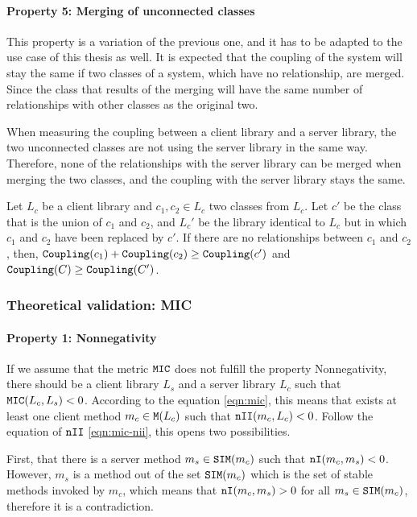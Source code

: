 \paragraph{Property 5: Merging of unconnected classes}
This property is a variation of the previous one, and it has to be adapted to the use case of this thesis as well. It is expected that the coupling of the system will stay the same if two classes of a system, which have no relationship, are merged. Since the class that results of the merging will have the same number of relationships with other classes as the original two.

When measuring the coupling between a client library and a server library, the two unconnected classes are not using the server library in the same way. Therefore, none of the relationships with the server library can be merged when merging the two classes, and the coupling with the server library stays the same.

Let $L_c$ be a client library and $c_1, c_2 \in L_c$ two classes from $L_c$. Let $c'$ be the class that is the union of  $c_1$ and $c_2$, and $L_c'$ be the library identical to $L_c$ but in which $c_1$ and $c_2$ have been replaced by $c'$. If there are no relationships between $c_1$ and $c_2$, then, $\verb|Coupling|(c_1) + \verb|Coupling|(c_2) \ge \verb|Coupling|(c')$ and $\verb|Coupling|(C) \ge \verb|Coupling|(C')$.

\subsubsection{Theoretical validation: MIC}

\paragraph{Property 1: Nonnegativity}
If we assume that the metric $\verb|MIC|$ does not fulfill the property Nonnegativity, there should be a client library $L_s$ and a server library $L_c$ such that $\verb|MIC|(L_c, L_s) < 0$.
According to the equation \ref{eqn:mic}, this means that exists at least one client method $m_c \in \verb|M|(L_c)$ such that $\verb|nII|(m_c, L_c) < 0$. Follow the equation of $\verb|nII|$ \ref{eqn:mic-nii}, this opens two possibilities.

First, that there is a server method $m_s \in \verb|SIM|(m_c)$ such that $\verb|nI|(m_c, m_s) < 0$. However, $m_s$ is a method out of the set $\verb|SIM|(m_c)$ which is the set of stable methods invoked by $m_c$, which means that $\verb|nI|(m_c, m_s) > 0$ for all $m_s \in \verb|SIM|(m_c)$, therefore it is a contradiction.

